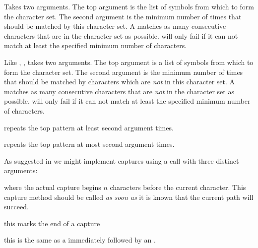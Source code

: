 \item {} Takes two arguments. The top argument is the list 
of symbols from which to form the character set. The second argument is 
the minimum number of times that should be matched by this character set. 
A  matches as many consecutive characters that are in 
the character set as possible.  will only fail if it can 
not match at least the specified minimum number of characters. 

\item {} Like , , 
takes two arguments. The top argument is a list of symbols from which to 
form the character set. The second argument is the minimum number of times 
that should be matched by characters which are \emph{not} in this 
character set. A  matches as many consecutive 
characters that are \emph{not} in the character set as possible. 
 will only fail if it can not match at least the 
specified minimum number of characters. 

\item {} repeats the top pattern at least second 
argument times. 

\item {} repeats the top pattern at most second 
argument times. 

\stopitemize 


As suggested in \cite{ierusalimschy2008lpegArticle} we might implement 
captures using a  call with three distinct arguments: 

\startitemize[n] 

\item {} where the actual capture begins $n$ characters before 
the current character. This capture method should be called \emph{as soon 
as} it is known that the current path will succeed. 

\item {} this marks the end of a capture 

\item {} this is the same as a  immediately 
followed by an . 

\stopitemize 

